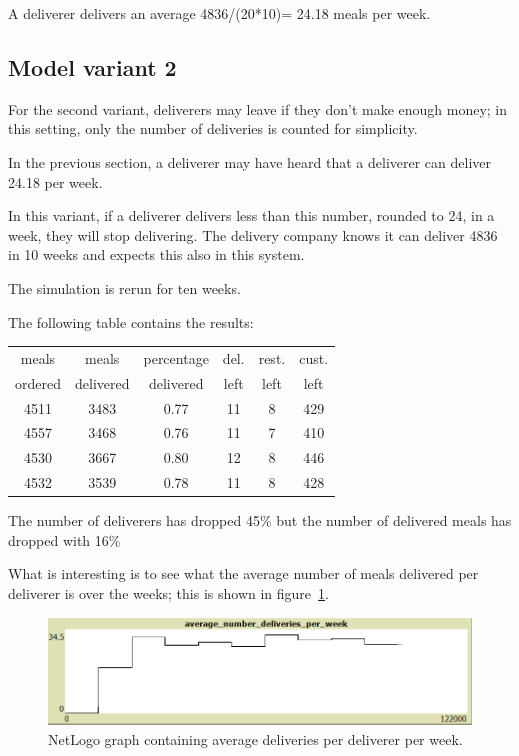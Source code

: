 A deliverer delivers an average 4836/(20*10)= 24.18 meals per week.


\subsection{Model variant 2}\label{subsec:model-variant-2}
For the second variant, deliverers may leave if they don't make enough money; in this setting, only the number of deliveries is counted for simplicity.

In the previous section, a deliverer may have heard that a deliverer can deliver 24.18 per week.

In this variant, if a deliverer delivers less than this number, rounded to 24, in a week, they will stop delivering.
The delivery company knows it can deliver 4836 in 10 weeks and expects this also in this system.

The simulation is rerun for ten weeks.

The following table contains the results:
\begin{center}
    \begin{tabular}{ |c|c|c|c|c|c| }
        \hline
        meals   & meals     &  percentage  & del. &  rest. & cust. \\
        ordered & delivered & delivered    & left &  left  & left  \\
        \hline
        \hline
        4511          & 3483           & 0.77    & 11         & 8  & 429                \\
        \hline
        4557          & 3468           & 0.76    & 11         & 7  & 410               \\
        \hline
        4530          & 3667           & 0.80    & 12         & 8   & 446              \\
        \hline
        \hline
        4532          & 3539           & 0.78    & 11         & 8  & 428  \\
        \hline
    \end{tabular}
\end{center}

The number of deliverers has dropped 45\% but the number of delivered meals has dropped with 16\%

What is interesting is to see what the average number of meals delivered per deliverer is over the weeks; this is shown in figure~\ref{fig:average}.

\begin{figure}
\centering
\includegraphics[width=12cm]{sections/pics/img}
\caption{NetLogo graph containing average deliveries per deliverer per week.}
\label{fig:average}
\end{figure}

